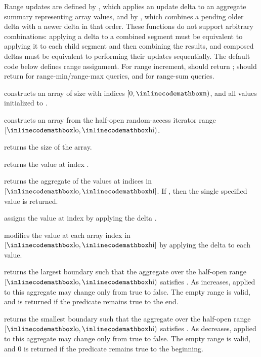 Range updates are defined by , which applies an update delta  to an aggregate summary  representing  array values, and by , which combines a pending older delta with a newer delta in that order. These functions do not support arbitrary combinations: applying a delta to a combined segment must be equivalent to applying it to each child segment and then combining the results, and composed deltas must be equivalent to performing their updates sequentially. The default code below defines range assignment. For range increment,  should return ;  should return  for range-min/range-max queries, and  for range-sum queries.

\begin{compactitem}
  \item {} constructs an array of size  with indices $[0, {\inlinecodemath{n}})$, and all values initialized to .
  \item {} constructs an array from the half-open random-access iterator range $[{\inlinecodemath{lo}}, {\inlinecodemath{hi}})$.
  \item {} returns the size of the array.
  \item {} returns the value at index .
  \item {} returns the aggregate of the values at indices in $[{\inlinecodemath{lo}}, {\inlinecodemath{hi}}]$. If , then the single specified value is returned.
  \item {} assigns the value at index  by applying the delta .
  \item {} modifies the value at each array index in $[{\inlinecodemath{lo}}, {\inlinecodemath{hi}}]$ by applying the delta  to each value.
  \item {} returns the largest boundary  such that the aggregate over the half-open range $[{\inlinecodemath{lo}}, {\inlinecodemath{hi}})$ satisfies . As  increases,  applied to this aggregate may change only from true to false. The empty range is valid, and  is returned if the predicate remains true to the end.
  \item {} returns the smallest boundary  such that the aggregate over the half-open range $[{\inlinecodemath{lo}}, {\inlinecodemath{hi}})$ satisfies . As  decreases,  applied to this aggregate may change only from true to false. The empty range is valid, and $0$ is returned if the predicate remains true to the beginning.
\end{compactitem}

